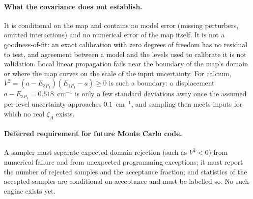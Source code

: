 \paragraph{What the covariance does not establish.} It is conditional on the map and contains no model error (missing perturbers, omitted interactions) and no numerical error of the map itself. It is not a goodness-of-fit: an exact calibration with zero degrees of freedom has no residual to test, and agreement between a model and the levels used to calibrate it is not validation. Local linear propagation fails near the boundary of the map's domain or where the map curves on the scale of the input uncertainty. For calcium, $V^2=(a-E_{3P_1})(E_{1P_1}-a)\ge0$ is such a boundary: a displacement $a-E_{3P_1}=0.518$~cm$^{-1}$ is only a few standard deviations away once the assumed per-level uncertainty approaches $0.1$~cm$^{-1}$, and sampling then meets inputs for which no real $\zeta_A$ exists.

\paragraph{Deferred requirement for future Monte Carlo code.} A sampler must separate expected domain rejection (such as $V^2<0$) from numerical failure and from unexpected programming exceptions; it must report the number of rejected samples and the acceptance fraction; and statistics of the accepted samples are conditional on acceptance and must be labelled so. No such engine exists yet.
